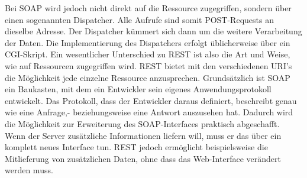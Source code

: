 Bei SOAP wird jedoch nicht direkt auf die Ressource zugegriffen, sondern über einen sogenannten Dispatcher. Alle Aufrufe sind somit POST-Requests an dieselbe Adresse. Der Dispatcher kümmert sich dann um die weitere Verarbeitung der Daten. Die Implementierung des Dispatchers erfolgt üblicherweise über ein CGI-Skript. Ein wesentlicher Unterschied zu REST ist also die Art und Weise, wie auf Ressourcen zugegriffen wird. REST bietet mit den verschiedenen URI’s die Möglichkeit jede einzelne Ressource anzusprechen. Grundsätzlich ist SOAP ein Baukasten, mit dem ein Entwickler sein eigenes Anwendungsprotokoll entwickelt. Das Protokoll, dass der Entwickler daraus definiert, beschreibt genau wie eine Anfrage,- beziehungsweise eine Antwort auszusehen hat. Dadurch wird die Möglichkeit zur Erweiterung des SOAP-Interfaces praktisch abgeschafft. Wenn der Server zusätzliche Informationen liefern will, muss er das über ein komplett neues Interface tun. REST jedoch ermöglicht beispielsweise die Mitlieferung von zusätzlichen Daten, ohne dass das Web-Interface verändert werden muss. \cite{RestSoap}
